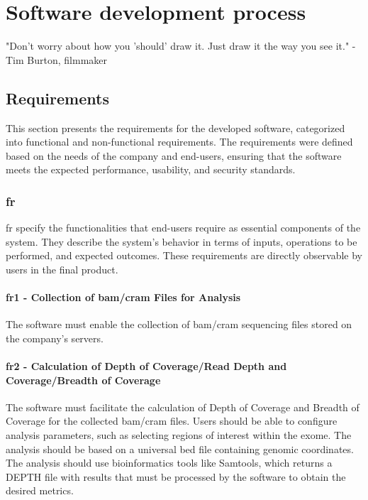 \chapter{Software development process}
\label{chapter:Analysis tool}

\begin{introduction}
    "Don't worry about how you 'should' draw it. Just draw it the way you see it." - Tim Burton, filmmaker
\end{introduction}

\section{Requirements}

This section presents the requirements for the developed software, categorized into functional and non-functional requirements. The requirements were defined based on the needs of the company and end-users, ensuring that the software meets the expected performance, usability, and security standards.
\subsection{\acl{fr}}

\ac{fr} specify the functionalities that end-users require as essential components of the system. They describe the system's behavior in terms of inputs, operations to be performed, and expected outcomes. These requirements are directly observable by users in the final product. \cite{Geeks2024}

\subsubsection{\textbf{\ac{fr}1 - Collection of \ac{bam}/\ac{cram} Files for Analysis}}

The software must enable the collection of \ac{bam}/\ac{cram} sequencing files stored on the company's servers.

\subsubsection{\textbf{\ac{fr}2 - Calculation of Depth of Coverage/Read Depth and Coverage/Breadth of Coverage}}

The software must facilitate the calculation of Depth of Coverage and Breadth of Coverage for the collected \ac{bam}/\ac{cram} files. Users should be able to configure analysis parameters, such as selecting regions of interest within the exome. The analysis should be based on a universal \ac{bed} file containing genomic coordinates. The analysis should use bioinformatics tools like Samtools, which returns a DEPTH file with results that must be processed by the software to obtain the desired metrics.

